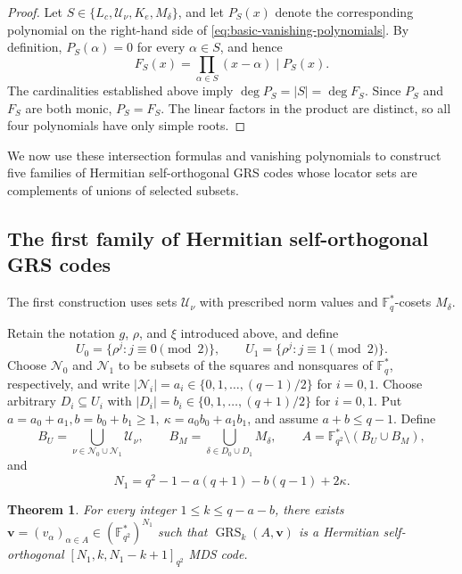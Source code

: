 \documentclass[preprint,12pt,a4paper]{elsarticle}
\newtheorem{theorem}{Theorem}[section]
\newcommand{\GRS}{\operatorname{GRS}}
\begin{document}
\begin{proof}
Let $S\in\{L_c,\mathcal U_\nu,K_e,M_\delta\}$, and let $P_S(x)$ denote the corresponding polynomial on the right-hand side of \eqref{eq:basic-vanishing-polynomials}. By definition, $P_S(\alpha)=0$ for every $\alpha\in S$, and hence
\[
 F_S(x)=\prod_{\alpha\in S}(x-\alpha)\mid P_S(x).
\]
The cardinalities established above imply $\deg P_S=|S|=\deg F_S$. Since $P_S$ and $F_S$ are both monic, $P_S=F_S$. The linear factors in the product are distinct, so all four polynomials have only simple roots.
\end{proof}

We now use these intersection formulas and vanishing polynomials to construct five families of Hermitian self-orthogonal GRS codes whose locator sets are complements of unions of selected subsets.
\subsection{The first family of Hermitian self-orthogonal GRS codes}

The first construction uses sets $\mathcal U_\nu$ with prescribed norm values and $\mathbb F_q^{*}$-cosets $M_\delta$.

Retain the notation $g$, $\rho$, and $\xi$ introduced above, and define
\[
 U_0=\{\rho^j:j\equiv0\pmod2\},
 \qquad
 U_1=\{\rho^j:j\equiv1\pmod2\}.
\]
Choose $\mathcal N_0$ and $\mathcal N_1$ to be subsets of the squares and nonsquares of $\mathbb F_q^{*}$, respectively, and write $|\mathcal N_i|=a_i\in\{0,1,\ldots,(q-1)/2\}$ for $i=0,1$. Choose arbitrary $D_i\subseteq U_i$ with $|D_i|=b_i\in\{0,1,\ldots,(q+1)/2\}$ for $i=0,1$. Put $a=a_0+a_1,  b=b_0+b_1\ge1,\ \kappa=a_0b_0+a_1b_1$, and assume $a+b\le q-1$. Define
\[
 B_U=\bigcup_{\nu\in\mathcal N_0\cup\mathcal N_1}\mathcal U_\nu,
 \qquad
 B_M=\bigcup_{\delta\in D_0\cup D_1}M_\delta,
 \qquad
 A=\mathbb F_{q^2}^{*}\setminus(B_U\cup B_M),
\]
and
\[
 N_1=q^2-1-a(q+1)-b(q-1)+2\kappa.
\]

\begin{theorem}\label{thm:first-grs}
For every integer $1\le k\le q-a-b$, there exists $\boldsymbol v=(v_\alpha)_{\alpha\in A}\in (\mathbb F_{q^2}^{*})^{N_1}$ such that $\GRS_k(A,\boldsymbol v)$ is a Hermitian self-orthogonal $[N_1,k,N_1-k+1]_{q^2}$ MDS code.
\end{theorem}
\end{document}

